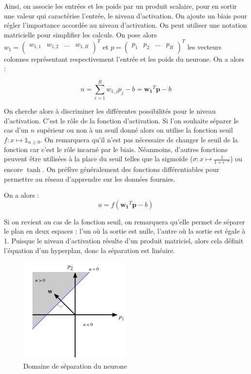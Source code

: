 Ainsi, on associe les entrées et les poids par un produit scalaire, pour en sortir une valeur qui caractérise l'entrée, le niveau d'activation.
On ajoute un biais pour régler l'importance accordée au niveau d'activation. On peut utiliser une notation matricielle pour simplifier les calculs.
On pose alors $w_1 = 
\begin{pmatrix}
  w_{1,1} & w_{1,2} & \ldots & w_{1,R}\\
\end{pmatrix}^T $ 
et
$ p = 
\begin{pmatrix}
 p_1 & p_2 & \ldots & p_R \\
\end{pmatrix}^T $ 
les vecteurs colonnes représentant respectivement l'entrée et les poids du neurone. On a alors :

\begin{equation} 
n = \sum_{i=1}^{R} w_{1,j} p_j - b = \mathbf{w_1}^T \mathbf{p} - b
\end{equation}

On cherche alors à discriminer les différentes possibilités pour le niveau d'activation. C'est le rôle de la fonction d'activation. Si l'on souhaite séparer
le cas d'un $n$ supérieur ou non à un seuil donné alors on utilise la fonction seuil $ f : x \mapsto \mathds{1}_{n \geq 0} $. On remarquera qu'il n'est 
pas nécessaire de changer le seuil de la fonction car c'est le rôle incarné par le biais. Néanmoins, d'autres fonctions peuvent être utilisées à la place
du seuil telles que la sigmoide ($\sigma : x \mapsto \frac{1}{1+e^{-x}}$) ou encore $\tanh$. On préfère généralement des fonctions différentiables pour
permettre au réseau d'apprendre sur les données fournies.

On a alors : 
\begin{equation}
 a = f(\mathbf{w_1}^T \mathbf{p} - b)
\end{equation}

Si on revient au cas de la fonction seuil, on remarquera qu'elle permet de séparer le plan en deux espaces : l'un où la sortie est nulle, l'autre où
la sortie est égale à 1. Puisque le niveau d'activation résulte d'un produit matriciel, alors cela définit l'équation d'un hyperplan, donc la séparation
est linéaire.

\begin{figure}[h]
 \centering
 \includegraphics[width=0.5\textwidth]{img/separation_lineaire_du_plan.png}
 \caption{Domaine de séparation du neurone}
\end{figure}

